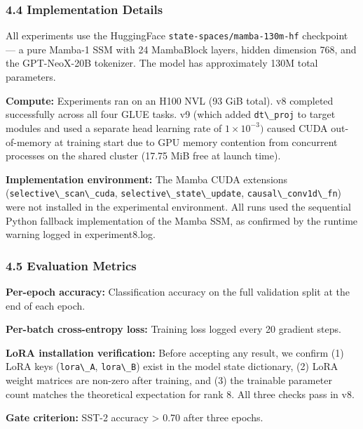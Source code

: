 \subsubsection{4.4 Implementation Details}

All experiments use the HuggingFace \texttt{state-spaces/mamba-130m-hf} checkpoint --- a pure Mamba-1 SSM with 24 MambaBlock layers, hidden dimension 768, and the GPT-NeoX-20B tokenizer. The model has approximately 130M total parameters.

\textbf{Compute:} Experiments ran on an H100 NVL (93 GiB total). v8 completed successfully across all four GLUE tasks. v9 (which added \texttt{dt\textbackslash \_proj} to target modules and used a separate head learning rate of $1\times 10^{-3})$ caused CUDA out-of-memory at training start due to GPU memory contention from concurrent processes on the shared cluster (17.75 MiB free at launch time).

\textbf{Implementation environment:} The Mamba CUDA extensions (\texttt{selective\textbackslash \_scan\textbackslash \_cuda}, \texttt{selective\textbackslash \_state\textbackslash \_update}, \texttt{causal\textbackslash \_conv1d\textbackslash \_fn}) were not installed in the experimental environment. All runs used the sequential Python fallback implementation of the Mamba SSM, as confirmed by the runtime warning logged in experiment8.log.

\subsubsection{4.5 Evaluation Metrics}

\textbf{Per-epoch accuracy:} Classification accuracy on the full validation split at the end of each epoch.

\textbf{Per-batch cross-entropy loss:} Training loss logged every 20 gradient steps.

\textbf{LoRA installation verification:} Before accepting any result, we confirm (1) LoRA keys (\texttt{lora\textbackslash \_A}, \texttt{lora\textbackslash \_B}) exist in the model state dictionary, (2) LoRA weight matrices are non-zero after training, and (3) the trainable parameter count matches the theoretical expectation for rank 8. All three checks pass in v8.

\textbf{Gate criterion:} SST-2 accuracy > 0.70 after three epochs.

